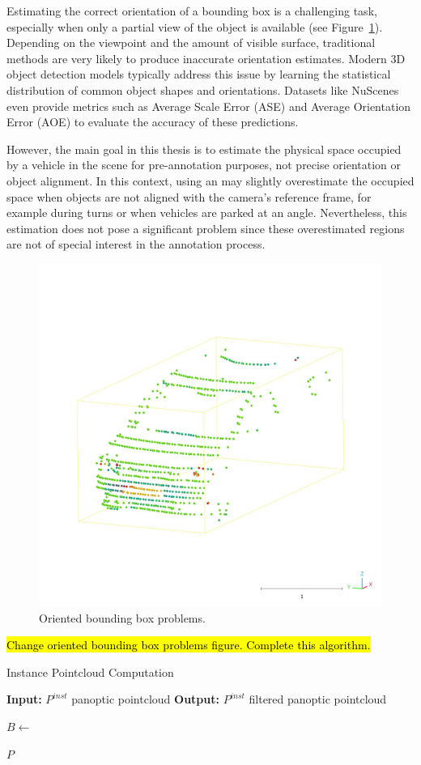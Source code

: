 Estimating the correct orientation of a bounding box is a challenging task, especially when only a partial view of the object is available (see Figure~\ref{fig:oriented_bounding_box_problems}). Depending on the viewpoint and the amount of visible surface, traditional methods are very likely to produce inaccurate orientation estimates. Modern 3D object detection models typically address this issue by learning the statistical distribution of common object shapes and orientations. Datasets like NuScenes even provide metrics such as Average Scale Error (ASE) and Average Orientation Error (AOE) to evaluate the accuracy of these predictions.

However, the main goal in this thesis is to estimate the physical space occupied by a vehicle in the scene for pre-annotation purposes, not precise orientation or object alignment. In this context, using an  may slightly overestimate the occupied space when objects are not aligned with the camera's reference frame, for example during turns or when vehicles are parked at an angle. Nevertheless, this estimation does not pose a significant problem since these overestimated regions are not of special interest in the annotation process.

\begin{figure}[h!]
    \centering
    \includegraphics[width=0.5\linewidth]{images/methodology/oriendet_bbox_problem_aux.jpeg}
    \caption{Oriented bounding box problems.}
    \label{fig:oriented_bounding_box_problems}
\end{figure}

\hl{Change oriented bounding box problems figure. Complete this algorithm.}
\begin{algorithm}
    \caption{Instance Pointcloud Computation}
    \label{algorithm:instance_pointcloud}
    \footnotesize

    \begin{algorithmic}[1]
        \State \textbf{Input:} $P^{inst}$ panoptic pointcloud
        \State \textbf{Output:} $P^{inst}$ filtered panoptic pointcloud
        
                \State $B \gets $
            
            \EndFor
        \EndFor
        
        \State \Return $P$
    \end{algorithmic}
\end{algorithm}

